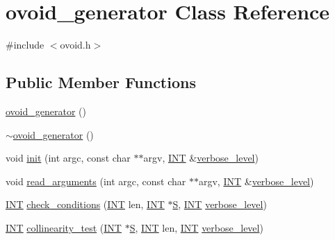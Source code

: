 \hypertarget{classovoid__generator}{}\section{ovoid\+\_\+generator Class Reference}
\label{classovoid__generator}


{\ttfamily \#include $<$ovoid.\+h$>$}

\subsection*{Public Member Functions}
\begin{DoxyCompactItemize}
\item 
\mbox{\hyperlink{classovoid__generator_a22cb69fdb7022c68d3bf3c32ca74ec70}{ovoid\+\_\+generator}} ()
\item 
\mbox{\hyperlink{classovoid__generator_a383548cbaaa7b6aae96a2663a871ab72}{$\sim$ovoid\+\_\+generator}} ()
\item 
void \mbox{\hyperlink{classovoid__generator_a44d90a4751554076f432f35089a964c2}{init}} (int argc, const char $\ast$$\ast$argv, \mbox{\hyperlink{galois_8h_a09fddde158a3a20bd2dcadb609de11dc}{I\+NT}} \&\mbox{\hyperlink{simeon_8_c_a818073fbcc2f439e7c56952f67386122}{verbose\+\_\+level}})
\item 
void \mbox{\hyperlink{classovoid__generator_a85df34db52d1f49f1f9c60dfdbf87040}{read\+\_\+arguments}} (int argc, const char $\ast$$\ast$argv, \mbox{\hyperlink{galois_8h_a09fddde158a3a20bd2dcadb609de11dc}{I\+NT}} \&\mbox{\hyperlink{simeon_8_c_a818073fbcc2f439e7c56952f67386122}{verbose\+\_\+level}})
\item 
\mbox{\hyperlink{galois_8h_a09fddde158a3a20bd2dcadb609de11dc}{I\+NT}} \mbox{\hyperlink{classovoid__generator_a6238427dcb098555e2067902ffde98f9}{check\+\_\+conditions}} (\mbox{\hyperlink{galois_8h_a09fddde158a3a20bd2dcadb609de11dc}{I\+NT}} len, \mbox{\hyperlink{galois_8h_a09fddde158a3a20bd2dcadb609de11dc}{I\+NT}} $\ast$\mbox{\hyperlink{simeon_8_c_adab47f8243f1b5a2c31df2535d6b37d0}{S}}, \mbox{\hyperlink{galois_8h_a09fddde158a3a20bd2dcadb609de11dc}{I\+NT}} \mbox{\hyperlink{simeon_8_c_a818073fbcc2f439e7c56952f67386122}{verbose\+\_\+level}})
\item 
\mbox{\hyperlink{galois_8h_a09fddde158a3a20bd2dcadb609de11dc}{I\+NT}} \mbox{\hyperlink{classovoid__generator_ae2779df2b3b46df65bc89b774ed37d9a}{collinearity\+\_\+test}} (\mbox{\hyperlink{galois_8h_a09fddde158a3a20bd2dcadb609de11dc}{I\+NT}} $\ast$\mbox{\hyperlink{simeon_8_c_adab47f8243f1b5a2c31df2535d6b37d0}{S}}, \mbox{\hyperlink{galois_8h_a09fddde158a3a20bd2dcadb609de11dc}{I\+NT}} len, \mbox{\hyperlink{galois_8h_a09fddde158a3a20bd2dcadb609de11dc}{I\+NT}} \mbox{\hyperlink{simeon_8_c_a818073fbcc2f439e7c56952f67386122}{verbose\+\_\+level}})

\end{DoxyCompactItemize}
